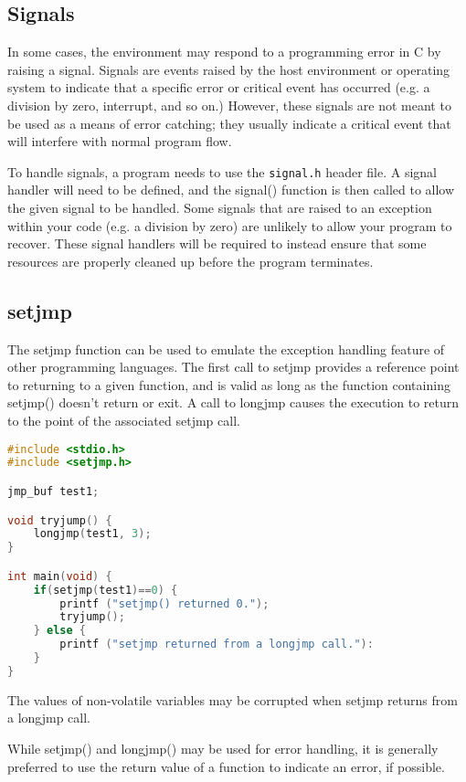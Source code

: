 \subsection{Signals}
In some cases, the environment may respond to a programming error in C by
raising a signal. Signals are events raised by the host environment or
operating system to indicate that a specific error or critical event has
occurred (e.g. a division by zero, interrupt, and so on.) However, these
signals are not meant to be used as a means of error catching; they usually
indicate a critical event that will interfere with normal program flow. 

To handle signals, a program needs to use the \texttt{signal.h} header file. A
signal handler will need to be defined, and the signal() function is then
called to allow the given signal to be handled. Some signals that are raised to
an exception within your code (e.g. a division by zero) are unlikely to allow
your program to recover. These signal handlers will be required to instead
ensure that some resources are properly cleaned up before the program
terminates.

\subsection{setjmp}
The setjmp function can be used to emulate the exception handling feature of
other programming languages. The first call to setjmp provides a reference
point to returning to a given function, and is valid as long as the function
containing setjmp() doesn't return or exit. A call to longjmp causes the
execution to return to the point of the associated setjmp call.
\lstset{basicstyle=\scriptsize, numbers=left, captionpos=b, tabsize=4}
\begin{lstlisting}[caption=Section \thesection listing \arabic{errorcnt},language={C},
breaklines=true,xleftmargin=15pt, label=lst:section\thesection listing\arabic{errorcnt}]
#include <stdio.h>
#include <setjmp.h>

jmp_buf test1;

void tryjump() {
	longjmp(test1, 3);
}

int main(void) {
	if(setjmp(test1)==0) {
		printf ("setjmp() returned 0.");
		tryjump();
	} else {
		printf ("setjmp returned from a longjmp call."):
	}
}
\end{lstlisting}

The values of non-volatile variables may be corrupted when setjmp returns from
a longjmp call. 

While setjmp() and longjmp() may be used for error handling, it is generally
preferred to use the return value of a function to indicate an error, if
possible. 
